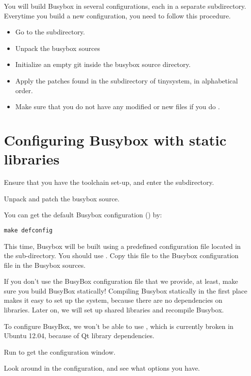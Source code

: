 You will build Busybox in several configurations, each in a separate subdirectory.
Everytime you build a new configuration, you need to follow this procedure.

\begin{itemize}
\item Go to the subdirectory.
\item Unpack the busybox sources
\item Initialize an empty git inside the busybox source directory.
\item Apply the patches found in the  subdirectory of {tinysystem}, in alphabetical order.
\item Make sure that you do not have any modified or new files if you do .
\end{itemize}


\section{Configuring Busybox with static libraries}

Ensure that you have the toolchain set-up, and enter the  subdirectory.

Unpack and patch the busybox source.

You can get the default Busybox configuration () by:

\begin{verbatim}
make defconfig
\end{verbatim}

This time, Busybox will be built using a predefined configuration file located in the 
 sub-directory. You should use .
Copy this file to the Busybox configuration file  in the Busybox sources.

If you don't use the BusyBox configuration file that we provide, at least,
make sure you build BusyBox statically! Compiling Busybox
statically in the first place makes it easy to set up the system,
because there are no dependencies on libraries. Later on, we will set
up shared libraries and recompile Busybox.

To configure BusyBox, we won't be able to use ,
which is currently broken in Ubuntu 12.04, because of Qt library
dependencies.

Run  to get the configuration window.

Look around in the configuration, and see what options you have.

